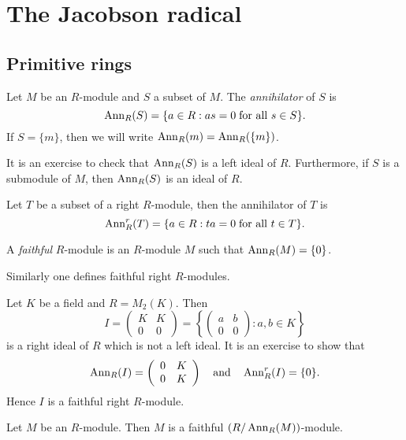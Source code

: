 \chapter{The Jacobson radical}
\label{radical}




\section{Primitive rings}
Let $M$ be an $R$-module and $S$ a subset of $M$. The \emph{annihilator} of $S$ is
\[
\operatorname{Ann}_R(S)=\{ a\in R:as=0\;\text{for all } s\in S\} .
\]
If $S=\{m\}$, then we will write $\operatorname{Ann}_R(m)=\operatorname{Ann}_R(\{m\})$.

It is an exercise to check that $\operatorname{Ann}_R(S)$ is a left ideal of $R$. Furthermore,
if $S$ is a submodule of $M$, then $\operatorname{Ann}_R(S)$ is an ideal of $R$.

Let $T$ be a subset of a right $R$-module, then the annihilator of $T$ is
\[
\operatorname{Ann}^r_R(T)=\{ a\in R: ta=0\;\text{for all }t\in T\} .
\]

\begin{definition}
    A \emph{faithful} $R$-module is an $R$-module $M$ such that $\operatorname{Ann}_R(M)=\{0\}$. 
\end{definition}

Similarly one defines faithful right $R$-modules.

\begin{example}
Let $K$ be a field and $R=M_2(K)$. Then
\[
I=\left(\begin{array}{cc} K&K\\
0&0\end{array}\right) =\left\{\left(\begin{array}{cc} a&b\\
0&0\end{array} \right): a,b\in K\right\} 
\]
is a right ideal of $R$ which is not a left ideal.
It is an exercise to show that 
\[
\operatorname{Ann}_R(I)=\left(\begin{array}{cc} 0&K\\
0&K\end{array}\right)\quad\mbox{and}\quad \operatorname{Ann}^r_R(I)=\{0\}.
\]
Hence $I$ is a faithful right $R$-module.
\end{example}

\begin{lemma}\label{Lema 1.1.1}
Let $M$ be an $R$-module. Then $M$ is a faithful
$(R/\operatorname{Ann}_R(M))$-module.
\end{lemma}

